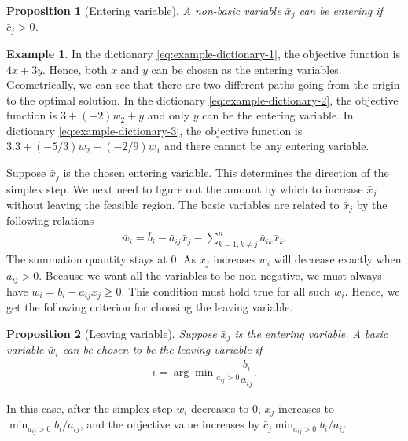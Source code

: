 \documentclass[
]{book}
\newtheorem{proposition}{Proposition}[chapter]
\theoremstyle{definition}
\theoremstyle{definition}
\newtheorem{example}{Example}[chapter]
\theoremstyle{definition}
\theoremstyle{definition}
\theoremstyle{remark}
\begin{document}
\begin{proposition}[Entering variable]
\protect\hypertarget{prp:entering-variable}{}\label{prp:entering-variable}A non-basic variable \(\bar{x}_j\) can be entering if \(\bar{c}_j > 0\).
\end{proposition}

\begin{example}
In the dictionary \eqref{eq:example-dictionary-1}, the objective function is \(4x + 3y\). Hence, both \(x\) and \(y\) can be chosen as the entering variables. Geometrically, we can see that there are two different paths going from the origin to the optimal solution. In the dictionary \eqref{eq:example-dictionary-2}, the objective function is \(3 + (-2)w_2 + y\) and only \(y\) can be the entering variable. In dictionary \eqref{eq:example-dictionary-3}, the objective function is \(3.3 + (-5/3)w_2 + (-2/9)w_1\) and there cannot be any entering variable.
\end{example}

Suppose \(\bar{x}_j\) is the chosen entering variable.
This determines the direction of the simplex step.
We next need to figure out the amount by which to increase \(\bar{x}_j\) without leaving the feasible region.
The basic variables are related to \(\bar{x}_j\) by the following relations
\begin{align*}
  \bar{w}_i = \bar{b}_i - \bar{a}_{ij} \bar{x}_j - \sum \limits_{k = 1, k \neq j}^{n}  \bar{a}_{ik} \bar{x}_k.
\end{align*}
The summation quantity stays at 0.
As \(x_j\) increases \(w_i\) will decrease exactly when \(a_{ij} > 0\).
Because we want all the variables to be non-negative, we must always have \(w_i = b_i - a_{ij} x_j \ge 0\).
This condition must hold true for all such \(w_i\). Hence, we get the following criterion for choosing the leaving variable.

\begin{proposition}[Leaving variable]
\protect\hypertarget{prp:leaving-variable}{}\label{prp:leaving-variable}Suppose \(\bar{x}_j\) is the entering variable. A basic variable \(\bar{w}_i\) can be chosen to be the leaving variable if
\begin{align*}
  i = {\arg \min} _{a_{ij} > 0} \dfrac{b_i}{a_{ij}}.
\end{align*}
\end{proposition}

In this case, after the simplex step \(w_i\) decreases to \(0\), \(x_j\) increases to \(\min_{a_{ij} > 0} {b_i}/{a_{ij}}\), and the objective value increases by \(\bar{c}_j \min_{a_{ij} > 0} {b_i}/{a_{ij}}\).
\end{document}

